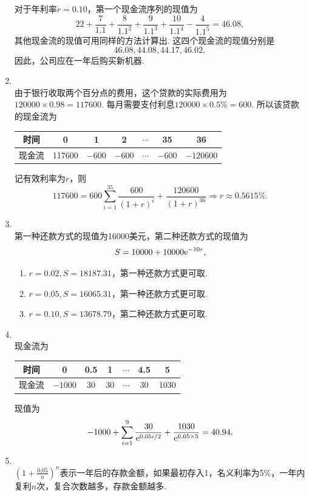 \begin{enumerate}[label=\arabic{section}.\arabic*]
    对于年利率$r=0.10$，第一个现金流序列的现值为
    \[22+\frac{7}{1.1}+\frac{8}{1.1^2}+\frac{9}{1.1^3}+\frac{10}{1.1^4}-\frac{4}{1.1^5}=46.08,\]
    其他现金流的现值可用同样的方法计算出. 这四个现金流的现值分别是
    \[46.08, 44.08, 44.17, 46.02,\]
    因此，公司应在一年后购买新机器.
    \item \sol\\
    由于银行收取两个百分点的费用，这个贷款的实际费用为$120000 \times 0.98=117600$. 每月需要支付利息$120000 \times 0.5\%=600$. 所以该贷款的现金流为
    \begin{table}[H]
        \centering
        \begin{tabular}{c|c|c|c|c|c|c}
            时间 & 0 & 1 & 2 & $\cdots$ & 35 & 36 \\ \hline
            现金流 & 117600 & $-600$ & $-600$ & $\cdots$ & $-600$ & $-120600$
        \end{tabular}
    \end{table}
    记有效利率为$r$，则
    \[117600=600\sum_{i=1}^{35}\frac{600}{(1+r)^i}+\frac{120600}{(1+r)^{36}} \Rightarrow r \approx 0.5615\%.\]
    \item \sol\\
    第一种还款方式的现值为16000美元，第二种还款方式的现值为
    \[S=10000+10000\mathrm{e}^{-10r},\]
    \begin{enumerate}[label=\alph*)]
        \item $r = 0.02, S = 18187.31$，第一种还款方式更可取.
        \item $r = 0.05, S = 16065.31$，第一种还款方式更可取.
        \item $r = 0.10, S = 13678.79$，第二种还款方式更可取.
    \end{enumerate}
    \item \sol\\
    现金流为
    \begin{table}[H]
        \centering
        \begin{tabular}{c|c|c|c|c|c|c}
            时间 & 0 & 0.5 & 1 & $\cdots$ & 4.5 & 5 \\ \hline
            现金流 & $-1000$ & 30 & 30 & $\cdots$ & 30 & 1030
        \end{tabular}
    \end{table}
    现值为
    \[-1000+\sum_{i=1}^{9}\frac{30}{\mathrm{e}^{0.05i/2}}+\frac{1030}{\mathrm{e}^{0.05\times 5}}=40.94.\]
    \item \sol\\
    $\displaystyle \left(1+\frac{0.05}{n}\right)^n$表示一年后的存款金额，如果最初存入1，名义利率为5\%，一年内复利$n$次，复合次数越多，存款金额越多.

\end{enumerate}

